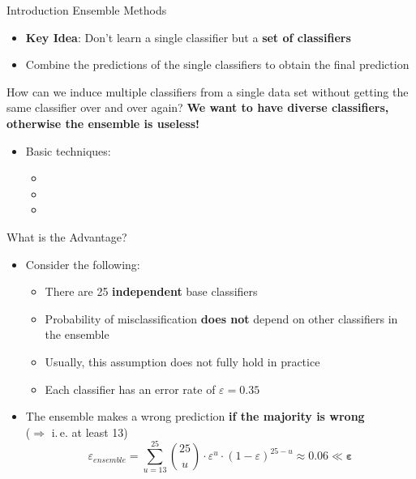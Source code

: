 \begin{frame}{Introduction Ensemble Methods}{}
	\begin{itemize}
		\item \textbf{Key Idea}: Don't learn a single classifier but a \textbf{set of classifiers}
		\item Combine the predictions of the single classifiers to obtain the final prediction
	\end{itemize}
		
	\begin{boxBlueNoFrame}
		\footnotesize
		 How can we induce multiple classifiers from a single data set without getting
		the same classifier over and over again? \textbf{We want to have diverse classifiers,
		otherwise the ensemble is useless!}	
	\end{boxBlueNoFrame}
		
	\begin{itemize}
		\item Basic techniques:
		\begin{itemize}
			\item {}
			\item {}
			\item {}
		\end{itemize}
	\end{itemize}
\end{frame}


\begin{frame}{What is the Advantage?}{}
	\begin{itemize}
		\item Consider the following:
		\begin{itemize}
			\item There are 25 \textbf{independent} base classifiers
			\item {}
				Probability of misclassification \textbf{does not} depend on other classifiers in the ensemble
			\item Usually, this assumption does not fully hold in practice
			\item Each classifier has an error rate of $\varepsilon = 0.35$
		\end{itemize}
		\item The ensemble makes a wrong prediction \textbf{if the majority is wrong} \\
			($\Rightarrow$ i.\,e. at least 13)
		\begin{equation}
			\varepsilon_{ensemble}
				= \sum_{u=13}^{25} \binom{25}{u} \cdot \varepsilon^u \cdot (1 - \varepsilon)^{25 - u}
				\approx \bm{0.06 \ll \varepsilon}
		\end{equation}
	\end{itemize}
\end{frame}


